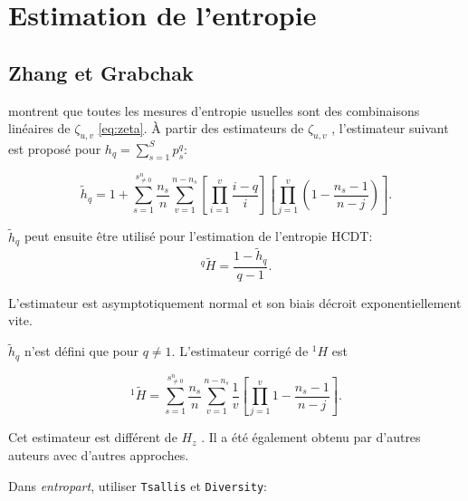\documentclass[
  11pt,
  french,
  a4paper,
  extrafontsizes,onecolumn,openright
  ]{memoir}
\newenvironment{Shaded}{\begin{snugshade}}{\end{snugshade}}
\newcommand{\DataTypeTok}[1]{\textcolor[rgb]{0.13,0.29,0.53}{#1}}
\newcommand{\DecValTok}[1]{\textcolor[rgb]{0.00,0.00,0.81}{#1}}
\newcommand{\KeywordTok}[1]{\textcolor[rgb]{0.13,0.29,0.53}{\textbf{#1}}}
\newcommand{\NormalTok}[1]{#1}
\newcommand{\OperatorTok}[1]{\textcolor[rgb]{0.81,0.36,0.00}{\textbf{#1}}}
\newcommand{\StringTok}[1]{\textcolor[rgb]{0.31,0.60,0.02}{#1}}
\begin{document}
\hypertarget{estimation-de-lentropie}{%
\section{Estimation de l'entropie}\label{estimation-de-lentropie}}

\hypertarget{zhang-et-grabchak}{%
\subsection{Zhang et Grabchak}\label{zhang-et-grabchak}}

\textcite{Zhang2014} montrent que toutes les mesures d'entropie usuelles sont des combinaisons linéaires de \({\zeta}_{u,v}\) \eqref{eq:zeta}.
À partir des estimateurs de \({\zeta}_{u,v}\) \autocite{Zhang2010}, l'estimateur suivant est proposé pour \(h_q=\sum^S_{s=1}{p^q_s}\):

\begin{equation}
  \label{eq:Zhang2014hq}
  \tilde{h}_q = 1+\sum^{s^{n}_{\ne 0}}_{s=1}{\frac{n_s}{n}\sum^{n-n_s}_{v=1}{\left[\prod^v_{i=1}{\frac{i-q}{i}}\right]\left[\prod^v_{j=1}{\left(1-\frac{n_s-1}{n-j}\right)}\right]}}.
\end{equation}

\(\tilde{h}_q\) peut ensuite être utilisé pour l'estimation de l'entropie HCDT:
\begin{equation}
  \label{eq:HqZhang}
  ^q\!{\tilde{H}}
  = \frac{1-\tilde{h}_q}{q-1}.
\end{equation}

L'estimateur est asymptotiquement normal et son biais décroit exponentiellement vite.

\(\tilde{h}_q\) n'est défini que pour \(q\ne 1\).
L'estimateur corrigé de \(^{1}\!H\) est

\begin{equation}
  \label{eq:H1Zhang}
  ^1\!{\tilde{H}} =\sum^{s^{n}_{\ne 0}}_{s=1}{\frac{n_s}{n}\sum^{n-n_s}_{v=1}{\frac{1}{v}\left[\prod^v_{j=1}{1-\frac{n_s-1}{n-j}}\right]}}.
\end{equation}

Cet estimateur est différent de \(H_z\) \autocite{Zhang2012}.
Il a été également obtenu par d'autres auteurs \autocites{Mao2007}{Vinck2012}[Annexe S1]{Chao2013} avec d'autres approches.

Dans \emph{entropart}, utiliser \texttt{Tsallis} et \texttt{Diversity}:

\scriptsize

\begin{Shaded}
\end{Shaded}
\end{document}
